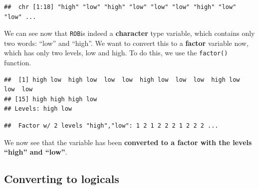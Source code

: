 \documentclass[]{book}
\newenvironment{Shaded}{\begin{snugshade}}{\end{snugshade}}
\newcommand{\KeywordTok}[1]{\textcolor[rgb]{0.13,0.29,0.53}{\textbf{#1}}}
\newcommand{\NormalTok}[1]{#1}
\newcommand{\OperatorTok}[1]{\textcolor[rgb]{0.81,0.36,0.00}{\textbf{#1}}}
\begin{document}
\begin{Shaded}
\end{Shaded}

\begin{verbatim}
##  chr [1:18] "high" "low" "high" "low" "low" "low" "high" "low" "low" ...
\end{verbatim}

We can see now that \texttt{ROB}is indeed a \textbf{character} type variable, which contains only two words: ``low'' and ``high''. We want to convert this to a \textbf{factor} variable now, which has only two levels, low and high. To do this, we use the \texttt{factor()} function.

\begin{Shaded}
\end{Shaded}

\begin{verbatim}
##  [1] high low  high low  low  low  high low  low  low  high low  low  low 
## [15] high high high low 
## Levels: high low
\end{verbatim}

\begin{Shaded}
\end{Shaded}

\begin{verbatim}
##  Factor w/ 2 levels "high","low": 1 2 1 2 2 2 1 2 2 2 ...
\end{verbatim}

We now see that the variable has been \textbf{converted to a factor with the levels ``high'' and ``low''}.

\hypertarget{converting-to-logicals}{%
\subsection{Converting to logicals}\label{converting-to-logicals}}
\end{document}
